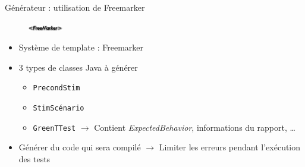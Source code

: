 \documentclass{beamer}
\begin{document}
\begin{frame}{Générateur : utilisation de Freemarker}
	~
	\begin{figure}
		\includegraphics[width=1.5cm]{FreeMaker.png}
	\end{figure}
	\vspace{-30px}
	\begin{itemize}
		\item Système de template : Freemarker
			\vfill
			\pause
		\item 3 types de classes Java à générer
		\begin{itemize}
			\item \texttt{PrecondStim}
			\item \texttt{StimScénario}
			\item \texttt{GreenTTest} $\rightarrow$ Contient \textit{ExpectedBehavior}, informations du rapport, \ldots
		\end{itemize}
		\pause
			\vfill
		\item Générer du code qui sera compilé\newline
			$\rightarrow$ Limiter les erreurs pendant l'exécution des tests
	\end{itemize}
\end{frame}
\end{document}
